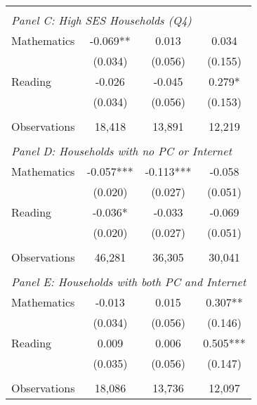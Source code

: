 {\begin{tabular}{lccc}
&  &  &   \\
\multicolumn{4}{l}{\textit{Panel C: High SES Households (Q4)}} \\
\hspace{3mm}Mathematics&      -0.069** &       0.013   &       0.034   \\
                    &     (0.034)   &     (0.056)   &     (0.155)   \\
 
\hspace{3mm}Reading &      -0.026   &      -0.045   &       0.279*  \\
                    &     (0.034)   &     (0.056)   &     (0.153)   \\
                    &               &               &               \\
\hspace{3mm}Observations&      18,418   &      13,891   &      12,219   \\
 
&  &  &   \\
\multicolumn{4}{l}{\textit{Panel D: Households with no PC or Internet}} \\
\hspace{3mm}Mathematics&      -0.057***&      -0.113***&      -0.058   \\
                    &     (0.020)   &     (0.027)   &     (0.051)   \\
 
\hspace{3mm}Reading &      -0.036*  &      -0.033   &      -0.069   \\
                    &     (0.020)   &     (0.027)   &     (0.051)   \\
                    &               &               &               \\
\hspace{3mm}Observations&      46,281   &      36,305   &      30,041   \\
 
&  &  &   \\
\multicolumn{4}{l}{\textit{Panel E: Households with both PC and Internet}} \\
\hspace{3mm}Mathematics&      -0.013   &       0.015   &       0.307** \\
                    &     (0.034)   &     (0.056)   &     (0.146)   \\
 
\hspace{3mm}Reading &       0.009   &       0.006   &       0.505***\\
                    &     (0.035)   &     (0.056)   &     (0.147)   \\
                    &               &               &               \\
\hspace{3mm}Observations&      18,086   &      13,736   &      12,097   \\
 

\bottomrule
\end{tabular}
}
